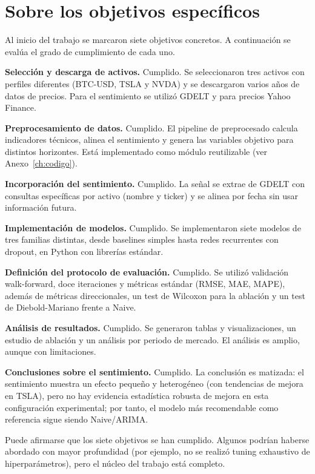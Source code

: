\section{Sobre los objetivos específicos}

Al inicio del trabajo se marcaron siete objetivos concretos. A continuación se evalúa el grado de cumplimiento de cada uno.

\textbf{Selección y descarga de activos.} Cumplido. Se seleccionaron tres activos con perfiles diferentes (BTC-USD, TSLA y NVDA) y se descargaron varios años de datos de precios. Para el sentimiento se utilizó GDELT y para precios Yahoo Finance.

\textbf{Preprocesamiento de datos.} Cumplido. El pipeline de preprocesado calcula indicadores técnicos, alinea el sentimiento y genera las variables objetivo para distintos horizontes. Está implementado como módulo reutilizable (ver Anexo~\ref{ch:codigo}).

\textbf{Incorporación del sentimiento.} Cumplido. La señal se extrae de GDELT con consultas específicas por activo (nombre y ticker) y se alinea por fecha sin usar información futura.

\textbf{Implementación de modelos.} Cumplido. Se implementaron siete modelos de tres familias distintas, desde baselines simples hasta redes recurrentes con dropout, en Python con librerías estándar.

\textbf{Definición del protocolo de evaluación.} Cumplido. Se utilizó validación walk-forward, doce iteraciones y métricas estándar (RMSE, MAE, MAPE), además de métricas direccionales, un test de Wilcoxon para la ablación y un test de Diebold-Mariano frente a Naive.

\textbf{Análisis de resultados.} Cumplido. Se generaron tablas y visualizaciones, un estudio de ablación y un análisis por periodo de mercado. El análisis es amplio, aunque con limitaciones.

\textbf{Conclusiones sobre el sentimiento.} Cumplido. La conclusión es matizada: el sentimiento muestra un efecto pequeño y heterogéneo (con tendencias de mejora en TSLA), pero no hay evidencia estadística robusta de mejora en esta configuración experimental; por tanto, el modelo más recomendable como referencia sigue siendo Naive/ARIMA.

Puede afirmarse que los siete objetivos se han cumplido. Algunos podrían haberse abordado con mayor profundidad (por ejemplo, no se realizó tuning exhaustivo de hiperparámetros), pero el núcleo del trabajo está completo.

